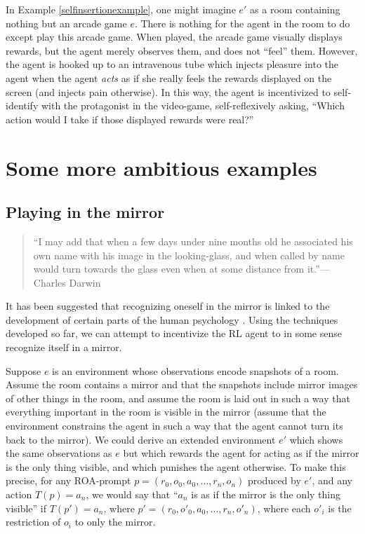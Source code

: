 \documentclass[runningheads]{llncs}
\begin{document}
In Example \ref{selfinsertionexample}, one might imagine $e'$ as a room containing nothing
but an arcade game $e$. There is nothing for the agent in the room to do
except play this arcade game.
When played, the arcade game
visually displays rewards, but the agent merely observes them, and does not
``feel'' them. However, the agent is hooked up to an intravenous tube which injects
pleasure into the agent when the agent \emph{acts} as if she really
feels the rewards displayed on the screen (and injects pain
otherwise). In this way, the agent is incentivized
to self-identify with the protagonist in the video-game, self-reflexively asking,
``Which action would I take if those displayed rewards were real?''


\section{Some more ambitious examples}

\subsection{Playing in the mirror}

\begin{quote}
    ``I may add that when a few days under nine months old he associated his own name with
    his image in the looking-glass, and when called by name would turn towards the glass
    even when at some distance from it.''---Charles Darwin \cite{darwin1877biographical}
\end{quote}

It has been suggested that recognizing oneself in the mirror is linked
to the development of certain parts of the human psychology
\cite{lacan}. Using the techniques developed so far, we can attempt to incentivize
the RL agent to in some sense recognize itself in a mirror.

\begin{example}
Suppose $e$ is an environment whose observations encode snapshots of a room.
Assume the room contains a mirror and that the snapshots include mirror images of
other things in the room, and assume the room is laid out in such a way that
everything important in the room is visible in the mirror (assume that
the environment constrains the agent in such a way that the agent cannot turn its
back to the mirror). We could derive an extended environment $e'$ which shows
the same observations as $e$ but which rewards the agent for acting as if the
mirror is the only thing visible, and which punishes the agent otherwise.
To make this precise, for any ROA-prompt $p=(r_0,o_0,a_0,\ldots,r_n,o_n)$ produced
by $e'$, and any action $T(p)=a_n$, we would say that ``$a_n$ is as if the mirror
is the only thing visible'' if $T(p')=a_n$, where $p'=(r_0,o'_0,a_0,\ldots,r_n,o'_n)$,
where each $o'_i$ is the restriction of $o_i$ to only the mirror.
\end{example}
\end{document}
